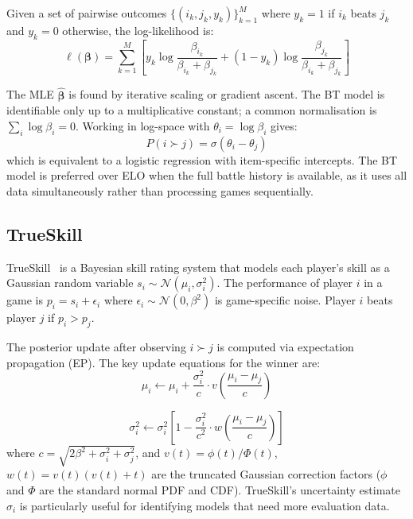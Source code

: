 Given a set of pairwise outcomes $\{(i_k, j_k, y_k)\}_{k=1}^{M}$ where $y_k = 1$ if $i_k$ beats $j_k$ and $y_k = 0$ otherwise, the log-likelihood is: 
\begin{equation}
    \ell(\boldsymbol{\beta}) = \sum_{k=1}^{M} \left[ y_k \log \frac{\beta_{i_k}}{\beta_{i_k} + \beta_{j_k}} + (1-y_k) \log \frac{\beta_{j_k}}{\beta_{i_k} + \beta_{j_k}} \right]
\end{equation}

The MLE $\hat{\boldsymbol{\beta}}$ is found by iterative scaling or gradient ascent. The BT model is identifiable only up to a multiplicative constant; a common normalisation is $\sum_i \log \beta_i = 0$. Working in log-space with $\theta_i = \log \beta_i$ gives: 
\begin{equation}
    P(i \succ j) = \sigma(\theta_i - \theta_j)
\end{equation}
 which is equivalent to a logistic regression with item-specific intercepts. The BT model is preferred over ELO when the full battle history is available, as it uses all data simultaneously rather than processing games sequentially.

\subsection{TrueSkill}
\label{trueskill}

TrueSkill~\cite{herbrich2006trueskill} is a Bayesian skill rating system that models each player’s skill as a Gaussian random variable $s_i \sim \mathcal{N}(\mu_i, \sigma_i^2)$. The performance of player $i$ in a game is $p_i = s_i + \epsilon_i$ where $\epsilon_i \sim \mathcal{N}(0, \beta^2)$ is game-specific noise. Player $i$ beats player $j$ if $p_i > p_j$.

The posterior update after observing $i \succ j$ is computed via expectation propagation (EP). The key update equations for the winner are: 
\begin{equation}
    \mu_i \leftarrow \mu_i + \frac{\sigma_i^2}{c} \cdot v\!\left(\frac{\mu_i - \mu_j}{c}\right)
\end{equation}
 
\begin{equation}
    \sigma_i^2 \leftarrow \sigma_i^2 \left[1 - \frac{\sigma_i^2}{c^2} \cdot w\!\left(\frac{\mu_i - \mu_j}{c}\right)\right]
\end{equation}
 where $c = \sqrt{2\beta^2 + \sigma_i^2 + \sigma_j^2}$, and $v(t) = \phi(t)/\Phi(t)$, $w(t) = v(t)(v(t) + t)$ are the truncated Gaussian correction factors ($\phi$ and $\Phi$ are the standard normal PDF and CDF). TrueSkill’s uncertainty estimate $\sigma_i$ is particularly useful for identifying models that need more evaluation data.


